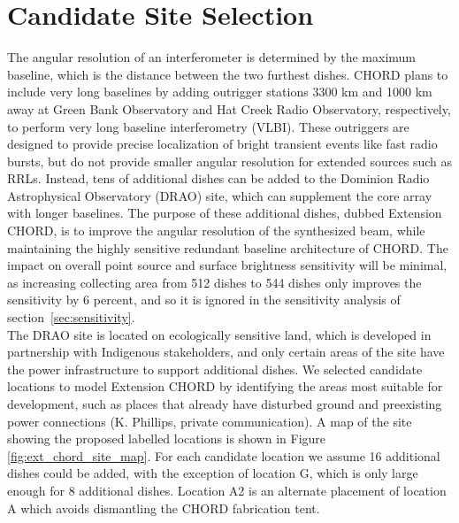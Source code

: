 
\label{sec:extension_chord}

\section{Candidate Site Selection}

The angular resolution of an interferometer is determined by the maximum baseline, which is the distance between the two furthest dishes. CHORD plans to include very long baselines by adding outrigger stations 3300 km and 1000 km away at Green Bank Observatory and Hat Creek Radio Observatory, respectively, to perform very long baseline interferometry (VLBI). These outriggers are designed to provide precise localization of bright transient events like fast radio bursts, but do not provide smaller angular resolution for extended sources such as RRLs. Instead, tens of additional dishes can be added to the Dominion Radio Astrophysical Observatory (DRAO) site, which can supplement the core array with longer baselines. The purpose of these additional dishes, dubbed Extension CHORD, is to improve the angular resolution of the synthesized beam, while maintaining the highly sensitive redundant baseline architecture of CHORD. The impact on overall point source and surface brightness sensitivity will be minimal, as increasing collecting area from 512 dishes to 544 dishes only improves the sensitivity by 6 percent, and so it is ignored in the sensitivity analysis of section~\ref{sec:sensitivity}.\\

The DRAO site is located on ecologically sensitive land, which is developed in partnership with Indigenous stakeholders, and only certain areas of the site have the power infrastructure to support additional dishes. We selected candidate locations to model Extension CHORD by identifying the areas most suitable for development, such as places that already have disturbed ground and preexisting power connections (K. Phillips, private communication). A map of the site showing the proposed labelled locations is shown in Figure \ref{fig:ext_chord_site_map}. For each candidate location we assume 16 additional dishes could be added, with the exception of location G, which is only large enough for 8 additional dishes. Location A2 is an alternate placement of location A which avoids dismantling the CHORD fabrication tent.

